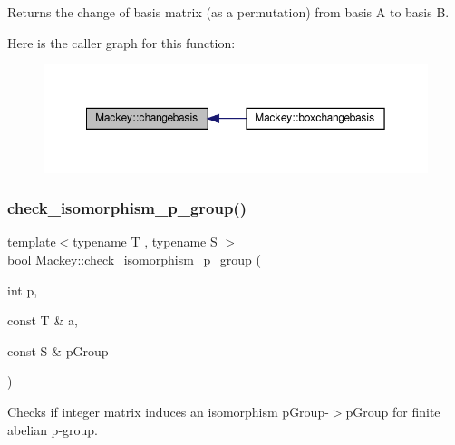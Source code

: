 Returns the change of basis matrix (as a permutation) from basis A to basis B. 

Here is the caller graph for this function\+:\nopagebreak
\begin{figure}[H]
\begin{center}
\leavevmode
\includegraphics[width=350pt]{namespaceMackey_aa2823da3a4b93dca63e00e50a6bc9fdf_icgraph}
\end{center}
\end{figure}
\mbox{\label{namespaceMackey_aa96cf972d89b207ce6709e867f760f37}} 
\subsubsection{\texorpdfstring{check\+\_\+isomorphism\+\_\+p\+\_\+group()}{check\_isomorphism\_p\_group()}}
{\footnotesize\ttfamily template$<$typename T , typename S $>$ \\
bool Mackey\+::check\+\_\+isomorphism\+\_\+p\+\_\+group (\begin{DoxyParamCaption}\item[{int}]{p,  }\item[{const T \&}]{a,  }\item[{const S \&}]{p\+Group }\end{DoxyParamCaption})}



Checks if integer matrix induces an isomorphism p\+Group-\/$>$p\+Group for finite abelian p-\/group. 

